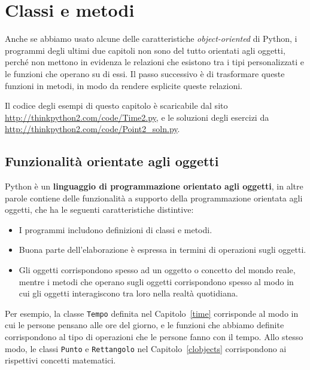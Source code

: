 \documentclass[10pt]{book}
\begin{document}
\chapter{Classi e metodi}

Anche se abbiamo usato alcune delle caratteristiche {\em object-oriented} di Python, i programmi degli ultimi due capitoli non sono del tutto orientati agli oggetti, perché non mettono in evidenza le relazioni che esistono tra i tipi personalizzati e le funzioni che operano su di essi. Il passo successivo è di trasformare queste funzioni in metodi, in modo da rendere esplicite queste relazioni.

Il codice degli esempi di questo capitolo è scaricabile dal sito
\url{http://thinkpython2.com/code/Time2.py}, e le soluzioni degli esercizi da \url{http://thinkpython2.com/code/Point2_soln.py}.

\section{Funzionalità orientate agli oggetti}

Python è un {\bf linguaggio di programmazione orientato agli oggetti}, in altre parole contiene delle funzionalità a supporto della programmazione orientata agli oggetti, che ha le seguenti caratteristiche distintive:

\begin{itemize}

\item I programmi includono definizioni di classi e metodi.  

\item Buona parte dell'elaborazione è espressa in termini di operazioni sugli oggetti.

\item Gli oggetti corrispondono spesso ad un oggetto o concetto del mondo reale, mentre i metodi che operano sugli oggetti corrispondono spesso al modo in cui gli oggetti interagiscono tra loro nella realtà quotidiana.

\end{itemize}

Per esempio, la classe {\tt Tempo} definita nel Capitolo~\ref{time}
corrisponde al modo in cui le persone pensano alle ore del giorno, e le funzioni che abbiamo definite corrispondono al tipo di operazioni che le persone fanno con il tempo. Allo stesso modo, le classi {\tt Punto} e {\tt Rettangolo} nel Capitolo~\ref{clobjects} corrispondono ai rispettivi concetti matematici.
\end{document}

